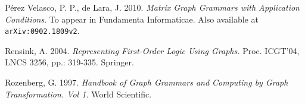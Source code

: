 \documentclass{fundam}
\begin{document}
\begin{thebibliography}{10}
 P\'erez Velasco, P. P., de Lara,
  J. 2010. \emph{Matrix Graph Grammars with Application
    Conditions}. To appear in Fundamenta Informaticae. Also available
  at {\texttt{arXiv:0902.1809v2}}.

 Rensink, A. 2004. {\em Representing First-Order
    Logic Using Graphs.}  Proc. ICGT'04, LNCS 3256, pp.: 319-335.
  Springer.

 {Rozenberg, G.} 1997.  {\em Handbook of Graph
    Grammars and Computing by Graph Transformation. Vol 1. } World
  Scientific.

\end{thebibliography}
\end{document}
